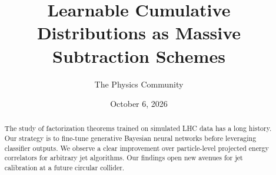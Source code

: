 \documentclass[11pt]{article}
\title{Learnable Cumulative Distributions as Massive Subtraction Schemes}
\author{The Physics Community}
\date{October 6, 2026}
\numberwithin{equation}{section}
\theoremstyle{definition}
\theoremstyle{remark}
\begin{document}
\maketitle
\begin{abstract}
The study of factorization theorems trained on simulated LHC data has a
long history. Our strategy is to fine-tune generative Bayesian neural
networks before leveraging classifier outputs. We observe a clear
improvement over particle-level projected energy correlators for
arbitrary jet algorithms. Our findings open new avenues for jet
calibration at a future circular collider.
\end{abstract}
\tableofcontents





\nocite{*}


\end{document}
